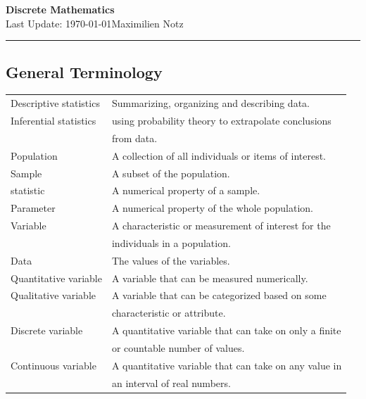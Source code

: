 \documentclass[5pt]{article}
\begin{document}
\newtheorem{theorem}{Theorem}
\newtheorem{lemma}{Lemma}
\newtheorem{properties}{Properties}
\newtheorem{axiom}{Axiom}


\begin{center}
     \Large{\textbf{Discrete Mathematics}}\\
     \small{Last Update: \today}\hfill\small{\textcopyright Maximilien Notz \the\year{}}
     \noindent\rule{20.2cm}{0.4pt}
\end{center}

\begin{multicols}{2}
\setcounter{secnumdepth}{0}
\subsection{General Terminology}
\begin{tabular}{L L}
    Descriptive statistics & Summarizing, organizing and describing data.\\
    Inferential statistics & using probability theory to extrapolate conclusions\\
                           & from data.\\
    Population & A collection of all individuals or items of interest.\\
    Sample & A subset of the population.\\
    statistic & A numerical property of a sample.\\
    Parameter & A numerical property of the whole population.\\
    Variable & A characteristic or measurement of interest for the\\
             & individuals in a population.\\
    Data & The values of the variables.\\
    Quantitative variable & A variable that can be measured numerically.\\
    Qualitative variable & A variable that can be categorized based on some\\
                         & characteristic or attribute.\\
    Discrete variable & A quantitative variable that can take on only a finite\\
                      & or countable number of values.\\
    Continuous variable & A quantitative variable that can take on any value in\\
                         & an interval of real numbers.\\

\end{tabular}
\end{multicols}
\end{document}
